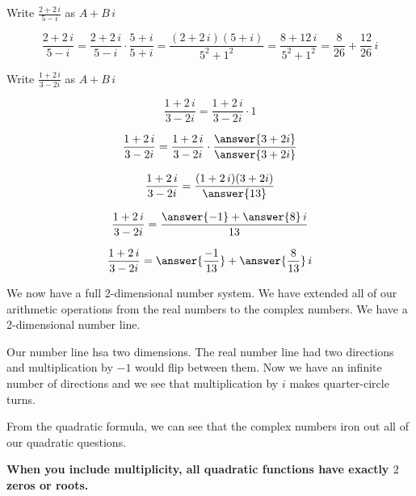 \documentclass{ximera}
\begin{document}
\begin{example}




Write $\frac{2 + 2 \, i}{5 - i}$ as $A + B \, i$


\begin{explanation}

\[
\frac{2 + 2 \, i}{5 - i} = \frac{2 + 2 \, i}{5 - i} \cdot \frac{5 + i}{5 + i} = \frac{(2 + 2 \, i)(5 + i)}{5^2 + 1^2} = \frac{8 + 12 \, i}{5^2 + 1^2} = \frac{8}{26} + \frac{12}{26} \, i
\]


\end{explanation}


\end{example}










\begin{question}


Write $\frac{1 + 2 \, i}{3 - 2i}$ as $A + B \, i$



\[
\frac{1 + 2 \, i}{3 - 2i} = \frac{1 + 2 \, i}{3 - 2i} \cdot  1
\]


\[
\frac{1 + 2 \, i}{3 - 2i} = \frac{1 + 2 \, i}{3 - 2i} \cdot  \frac{\answer{3 + 2i}}{\answer{3 + 2i}}
\]


\[
\frac{1 + 2 \, i}{3 - 2i} = \frac{(1 + 2 \, i)(3 + 2i)}{\answer{13}} 
\]


\[
\frac{1 + 2 \, i}{3 - 2i} = \frac{\answer{-1} + \answer{8} \, i}{13} 
\]


\[
\frac{1 + 2 \, i}{3 - 2i} = \answer{\frac{-1}{13}} + \answer{\frac{8}{13}} \, i
\]

\end{question}







We now have a full 2-dimensional number system.  We have extended all of our arithmetic operations from the real numbers to the complex numbers.  We have a 2-dimensional number line. 

Our number line hsa two dimensions.  The real number line had two directions and multiplication by $-1$ would flip between them.  Now we have an infinite number of directions and we see that multiplication by $i$ makes quarter-circle turns.

From the quadratic formula, we can see that the complex numbers iron out all of our quadratic questions.

\begin{center}
\textbf{\textcolor{red!80!black}{When you include multiplicity, all quadratic functions have exactly $2$ zeros or roots.}}
\end{center}
\end{document}
